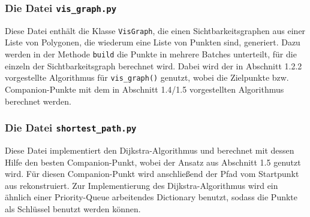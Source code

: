 \documentclass[a4paper, notitlepage, 12pt]{scrartcl}
\begin{document}
\subsubsection{Die Datei \texttt{vis\_graph.py}}
Diese Datei enthält die Klasse \texttt{VisGraph}, die einen Sichtbarkeitsgraphen aus einer Liste von Polygonen, die wiederum eine Liste von Punkten sind, generiert. Dazu werden in der Methode \texttt{build} die Punkte in mehrere Batches unterteilt, für die einzeln der Sichtbarkeitsgraph berechnet wird. Dabei wird der in Abschnitt 1.2.2 vorgestellte Algorithmus für \texttt{vis\_graph()} genutzt, wobei die Zielpunkte bzw. Companion-Punkte mit dem in Abschnitt 1.4/1.5 vorgestellten Algorithmus berechnet werden.
\subsubsection{Die Datei \texttt{shortest\_path.py}}
Diese Datei implementiert den Dijkstra-Algorithmus und berechnet mit dessen Hilfe den besten Companion-Punkt, wobei der Ansatz aus Abschnitt 1.5 genutzt wird. Für diesen Companion-Punkt wird anschließend der Pfad vom Startpunkt aus rekonstruiert. Zur Implementierung des Dijkstra-Algorithmus wird ein ähnlich einer Priority-Queue arbeitendes Dictionary benutzt, sodass die Punkte als Schlüssel benutzt werden können.
\end{document}
